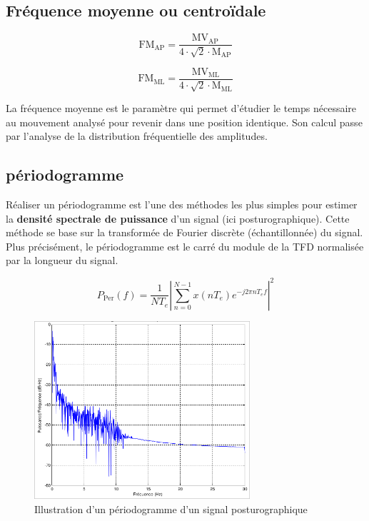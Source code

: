 \subsection{Fréquence moyenne ou centroïdale}

\begin{equation}
  \text{FM}_{\text{AP}} = \frac{\text{MV}_{\text{AP}}}{4\cdot\sqrt{2}\cdot\text{M}_{\text{AP}}}
  \label{eq:FM_AP}
\end{equation}

\begin{equation}
  \text{FM}_{\text{ML}} = \frac{\text{MV}_{\text{ML}}}{4 \cdot \sqrt{2} \cdot \text{M}_{\text{ML}}}
  \label{eq:FM_ML}
\end{equation}

La fréquence moyenne est le paramètre qui permet d'étudier le temps nécessaire au mouvement analysé pour revenir dans une position identique. 
Son calcul passe par l'analyse de la distribution fréquentielle des amplitudes.

\subsection{périodogramme}
\label{subsubsec:periodogramme}

Réaliser un périodogramme est l'une des méthodes les plus simples pour estimer la \textbf{densité spectrale de puissance} d'un signal (ici posturographique).
Cette méthode se base sur la transformée de Fourier discrète (échantillonnée) du signal.
Plus précisément, le périodogramme est le carré du module de la TFD normalisée par la longueur du signal.

\begin{equation}
  P_{\text{Per}}(f)=\frac{1}{NT_e}\left|\sum\limits_{n=0}^{N-1}x(nT_e)e^{-j2\pi nT_ef}\right|^2
  \label{eq:P_per}
\end{equation}

\begin{figure}[ht]
  \centering
  \includegraphics[width=8cm]{images/methode/periodogramme.png}
  \caption{Illustration d'un périodogramme d'un signal posturographique}
  \label{fig:periodogramme}
\end{figure}

